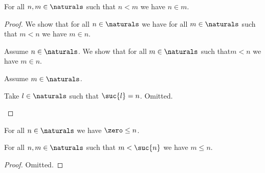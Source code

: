 \begin{proposition}\label{rless_eq_in_for_naturals}
    For all $n,m \in \naturals$ such that $n < m$ we have $n \in m$. 
\end{proposition}
\begin{proof}
    We show that for all $n \in \naturals$ we have for all $m \in \naturals$ such that $m < n$ we have $m \in n$.
    \begin{subproof}
        Assume $n \in \naturals$.
        We show that for all $m \in \naturals$ such that$m < n$ we have $m \in n$.
        \begin{subproof}
            Assume $m \in \naturals$.
            \begin{byCase}
                      \begin{byCase}
                            Take $l \in \naturals$ such that $\suc{l} = n$.
                            Omitted.

                      \end{byCase}
            \end{byCase}
        \end{subproof}
    \end{subproof}
    

    
\end{proof}



\begin{proposition}\label{naturals_leq}
    For all $n \in \naturals$ we have $\zero \leq n$.
\end{proposition}



\begin{proposition}\label{naturals_leq_on_suc}
    For all $n,m \in \naturals$ such that $m < \suc{n}$ we have $m \leq n$.
\end{proposition}
\begin{proof}
    Omitted.
\end{proof}

